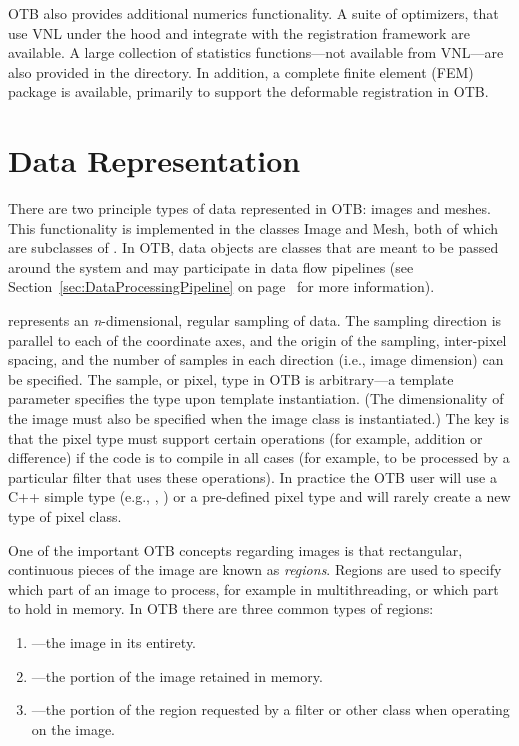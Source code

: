 OTB also provides additional numerics functionality. A suite of optimizers, that
use VNL under the hood and integrate with the registration framework
are available. A large collection of statistics functions---not available from
VNL---are also provided in the 
directory. In addition, a complete finite element (FEM) package is available,
primarily to support the deformable registration in OTB.


\section{Data Representation}
\label{sec:DataRepresentationAndAccess}


There are two principle types of data represented in OTB: images and
meshes. This functionality is implemented in the classes 
Image and Mesh, both of which are subclasses of
. In OTB, data objects are classes that are meant to
be passed around the system and may participate in data flow pipelines (see
Section~\ref{sec:DataProcessingPipeline} on
page~\pageref{sec:DataProcessingPipeline} for more information).



 represents an \emph{n}-dimensional, regular sampling of
data. The sampling direction is parallel to each of the coordinate axes, and
the origin of the sampling, inter-pixel spacing, and the number of samples in
each direction (i.e., image dimension) can be specified. The sample, or
pixel, type in OTB is arbitrary---a template parameter 
specifies the type upon template instantiation. (The dimensionality of the
image must also be specified when the image class is instantiated.) The key
is that the pixel type must support certain operations (for example, addition
or difference) if the code is to compile in all cases (for example, to be
processed by a particular filter that uses these operations). In practice the
OTB user will use a C++ simple type (e.g., , ) or a pre-defined pixel
type and will rarely create a new type of pixel class.

One of the important OTB concepts regarding images is that rectangular,
continuous pieces of the image are known as \emph{regions}. Regions are used
to specify which part of an image to process, for example in multithreading,
or which part to hold in memory. In OTB there are three common types of
regions:
\begin{enumerate}
\item {}---the image in its entirety.
\item {}---the portion of the image retained in memory.
\item {}---the portion of the region requested by a 
filter or other class when operating on the image.
\end{enumerate}

